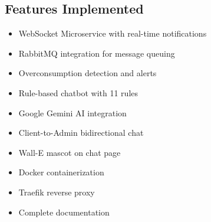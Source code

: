 \documentclass[12pt,a4paper]{article}
\begin{document}
\subsection{Features Implemented}
\begin{itemize}
    \item[$\checkmark$] WebSocket Microservice with real-time notifications
    \item[$\checkmark$] RabbitMQ integration for message queuing
    \item[$\checkmark$] Overconsumption detection and alerts
    \item[$\checkmark$] Rule-based chatbot with 11 rules
    \item[$\checkmark$] Google Gemini AI integration
    \item[$\checkmark$] Client-to-Admin bidirectional chat
    \item[$\checkmark$] Wall-E mascot on chat page
    \item[$\checkmark$] Docker containerization
    \item[$\checkmark$] Traefik reverse proxy
    \item[$\checkmark$] Complete documentation
\end{itemize}
\end{document}
